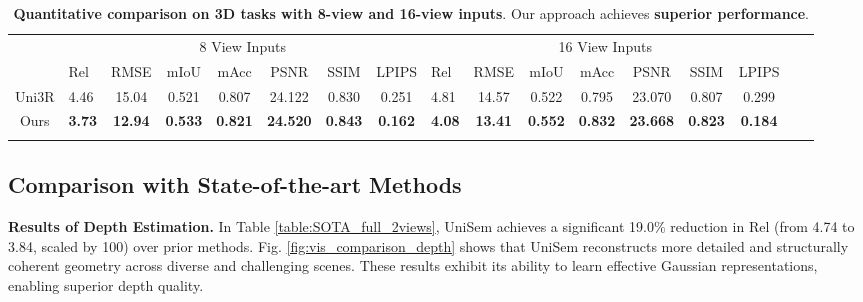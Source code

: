 \documentclass[runningheads]{llncs}
\begin{document}
\begin{table}[t]
\renewcommand{\arraystretch}{1.1}
\centering 
\caption{\textbf{Quantitative comparison on 3D tasks with 8-view and 16-view inputs}. Our approach achieves {\textbf{superior performance}}. 
}  
\vspace{-3mm}
\label{table:SOTA_full_Multiviews}
\begin{adjustbox} {width=\linewidth}
\begin{tabular}{ c | p{0.8cm}<{\centering} c c c c c c | p{0.8cm}<{\centering} c c c c c c c c  }
\Xhline{3\arrayrulewidth}
\multirow{2}{*}{Method} & \multicolumn{7}{c|}{8 View Inputs} & \multicolumn{7}{c}{16 View Inputs}\\ 
& Rel  & RMSE  & mIoU  & mAcc  & PSNR  & SSIM & LPIPS  
& Rel  & RMSE  & mIoU  & mAcc  & PSNR  & SSIM & LPIPS \\ 
\hline 
Uni3R \cite{uni3r}          & 4.46    & 15.04   & 0.521 & 0.807 & 24.122 & 0.830 & 0.251 & 4.81 & 14.57  & 0.522 & 0.795 & 23.070 & 0.807 & 0.299 \\
\rowcolor{lightblue} Ours  & \textbf{3.73} & \textbf{12.94} & \textbf{0.533} & \textbf{0.821} & \textbf{24.520} & \textbf{0.843} & \textbf{0.162} & \textbf{4.08} & \textbf{13.41} & \textbf{0.552} & \textbf{0.832} & \textbf{23.668} & \textbf{0.823} & \textbf{0.184}  \\ 
\Xhline{3\arrayrulewidth}
\end{tabular}
\end{adjustbox}
\end{table}



\subsection{Comparison with State-of-the-art Methods} \label{section:comparison_SOTA}  
\textbf{Results of Depth Estimation.} 
In Table \ref{table:SOTA_full_2views}, UniSem achieves a significant 19.0\% reduction in Rel (from 4.74 to 3.84, scaled by 100) over prior methods. 
Fig. \ref{fig:vis_comparison_depth} shows that UniSem reconstructs more detailed and structurally coherent geometry across diverse and challenging scenes. 
These results exhibit its ability to learn effective Gaussian representations, enabling superior depth quality. 
\end{document}
